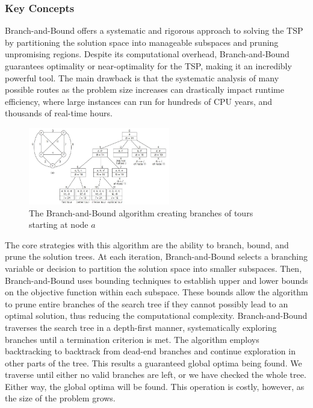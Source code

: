 \documentclass{article}
\begin{document}
\subsubsection{Key Concepts}
Branch-and-Bound offers a systematic and rigorous approach to solving the TSP by partitioning the solution space into manageable subspaces and pruning unpromising regions. Despite its computational overhead, Branch-and-Bound guarantees optimality or near-optimality for the TSP, making it an incredibly powerful tool. The main drawback is that the systematic analysis of many possible routes as the problem size increases can drastically impact runtime efficiency, where large instances can run for hundreds of CPU years, and thousands of real-time hours.
\begin{figure}[h]
    \centering
    \includegraphics[width=0.55\textwidth,keepaspectratio]{bnb.jpg}
    \caption{The Branch-and-Bound algorithm creating branches of tours starting at node $a$}
    \label{fig:bandb}
\end{figure}

\noindent The core strategies with this algorithm are the ability to branch, bound, and prune the solution trees. At each iteration, Branch-and-Bound selects a branching variable or decision to partition the solution space into smaller subspaces. Then, Branch-and-Bound uses bounding techniques to establish upper and lower bounds on the objective function within each subspace. These bounds allow the algorithm to prune entire branches of the search tree if they cannot possibly lead to an optimal solution, thus reducing the computational complexity. Branch-and-Bound traverses the search tree in a depth-first manner, systematically exploring branches until a termination criterion is met. The algorithm employs backtracking to backtrack from dead-end branches and continue exploration in other parts of the tree. This results a guaranteed global optima being found. We traverse until either no valid branches are left, or we have checked the whole tree. Either way, the global optima will be found. This operation is costly, however, as the size of the problem grows.
\end{document}
